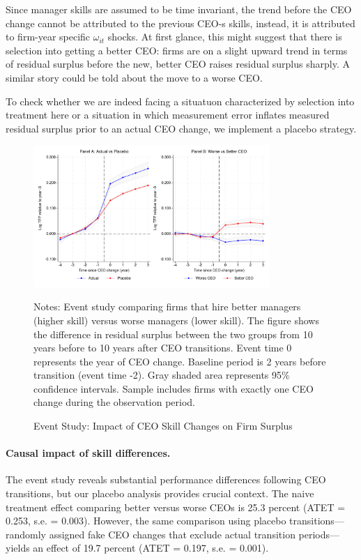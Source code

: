 \documentclass[11pt,a4paper]{article}
\begin{document}
Since manager skills are assumed to be time invariant, the trend before the CEO change cannot be attributed to the previous CEO-s skills, instead, it is attributed to firm-year specific $\omega_{it}$ shocks. At first glance, this might suggest that there is selection into getting a better CEO: firms are on a slight upward trend in terms of residual surplus before the new, better CEO raises residual surplus sharply. A similar story could be told about the move to a worse CEO.

To check whether we are indeed facing a situatuon characterized by selection into treatment here or a situation in which measurement error inflates measured residual surplus prior to an actual CEO change, we implement a placebo strategy.


\begin{figure}[htbp]
\centering
\includegraphics[width=0.8\textwidth]{figure/event_study.pdf}
\caption{Event Study: Impact of CEO Skill Changes on Firm Surplus}
\label{fig:event_study}
\footnotesize
Notes: Event study comparing firms that hire better managers (higher skill) versus worse managers (lower skill). The figure shows the difference in residual surplus between the two groups from 10 years before to 10 years after CEO transitions. Event time 0 represents the year of CEO change. Baseline period is 2 years before transition (event time -2). Gray shaded area represents 95\% confidence intervals. Sample includes firms with exactly one CEO change during the observation period.
\end{figure}

\paragraph{Causal impact of skill differences.} The event study reveals substantial performance differences following CEO transitions, but our placebo analysis provides crucial context. The naive treatment effect comparing better versus worse CEOs is 25.3 percent (ATET = 0.253, s.e. = 0.003). However, the same comparison using placebo transitions---randomly assigned fake CEO changes that exclude actual transition periods---yields an effect of 19.7 percent (ATET = 0.197, s.e. = 0.001).
\end{document}
